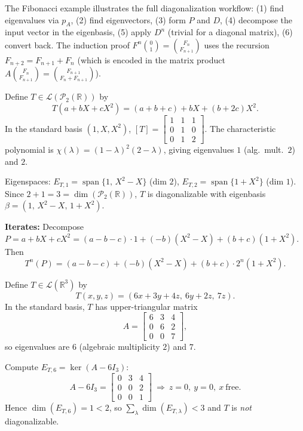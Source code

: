 The Fibonacci example illustrates the full diagonalization workflow:
(1) find eigenvalues via $p_A$, (2) find eigenvectors, (3) form $P$ and $D$, (4) decompose the input vector in the eigenbasis, (5) apply $D^n$ (trivial for a diagonal matrix), (6) convert back.
The induction proof $F^n\binom{0}{1}=\binom{F_n}{F_{n+1}}$ uses the recursion $F_{n+2}=F_{n+1}+F_n$ (which is encoded in the matrix product $A\binom{F_n}{F_{n+1}}=\binom{F_{n+1}}{F_n+F_{n+1}}$).

\begin{examplebox}[title={Worked Example (Tutorial 8, Question 2): diagonalization on $\mathcal{P}_2(\mathbb{R})$}]
Define $T\in\mathcal{L}(\mathcal{P}_2(\mathbb{R}))$ by
\[
T(a+bX+cX^2) = (a+b+c) + bX + (b+2c)X^2.
\]
In the standard basis $(1,X,X^2)$,
$[T] = \begin{bmatrix}1&1&1\\0&1&0\\0&1&2\end{bmatrix}$.
The characteristic polynomial is $\chi(\lambda)=(1-\lambda)^2(2-\lambda)$, giving eigenvalues $1$ (alg.\ mult.\ $2$) and $2$.

Eigenspaces: $E_{T,1}=\operatorname{span}\{1,\, X^2-X\}$ (dim $2$), $E_{T,2}=\operatorname{span}\{1+X^2\}$ (dim $1$).
Since $2+1=3=\dim(\mathcal{P}_2(\mathbb{R}))$, $T$ is diagonalizable with eigenbasis $\beta=(1,\, X^2-X,\, 1+X^2)$.

\textbf{Iterates:} Decompose $P=a+bX+cX^2 = (a-b-c)\cdot 1 + (-b)(X^2-X) + (b+c)(1+X^2)$.
Then
\[
T^n(P) = (a-b-c) + (-b)(X^2-X) + (b+c)\cdot 2^n(1+X^2).
\]
\end{examplebox}

\begin{examplebox}[title={Worked Example (Lecture Week 9): diagonalizable vs.\ defective (upper triangular $3\times 3$)}]
Define $T\in\mathcal{L}(\mathbb{R}^3)$ by
\[
T(x,y,z)=(6x+3y+4z,\ 6y+2z,\ 7z).
\]
In the standard basis, $T$ has upper-triangular matrix
\[
A=\begin{bmatrix}6&3&4\\0&6&2\\0&0&7\end{bmatrix},
\]
so eigenvalues are $6$ (algebraic multiplicity $2$) and $7$.

Compute $E_{T,6}=\ker(A-6I_3)$:
\[
A-6I_3=\begin{bmatrix}0&3&4\\0&0&2\\0&0&1\end{bmatrix}
\ \Rightarrow\ z=0,\ y=0,\ x\ \text{free}.
\]
Hence $\dim(E_{T,6})=1<2$, so $\sum_\lambda \dim(E_{T,\lambda})<3$ and $T$ is \emph{not} diagonalizable.
\end{examplebox}


